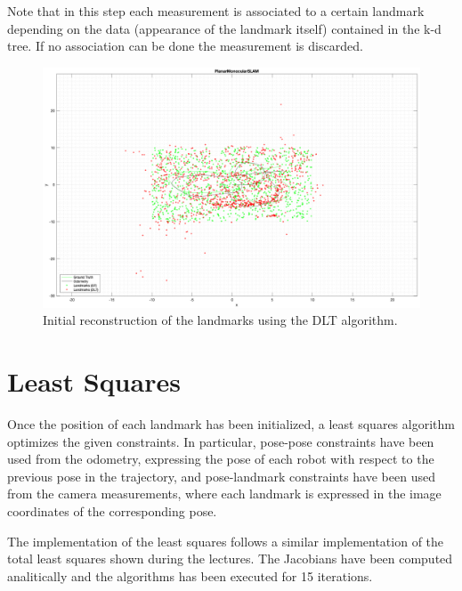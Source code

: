 \documentclass[11pt]{extarticle}
\begin{document}
Note that in this step each measurement
is associated to a certain landmark depending on the data (appearance of the
landmark itself) contained in the k-d tree. If no association can be done
the measurement is discarded.
\begin{figure}
    \centering
    \includegraphics[width=\textwidth]{images/dlt-init.png}
    \caption{Initial reconstruction of the landmarks using the DLT algorithm.}
    \label{fig:dlt-init}
\end{figure}

\section{Least Squares}
Once the position of each landmark has been initialized, a least squares
algorithm optimizes the given constraints. In particular, pose-pose constraints
have been used from the odometry, expressing the pose of each robot with
respect to the previous pose in the trajectory, and pose-landmark constraints
have been used from the camera measurements, where each landmark is expressed
in the image coordinates of the corresponding pose.

The implementation of the least squares follows a similar implementation of the
total least squares shown during the lectures. The Jacobians have been computed
analitically and the algorithms has been executed for 15 iterations.


\end{document}
